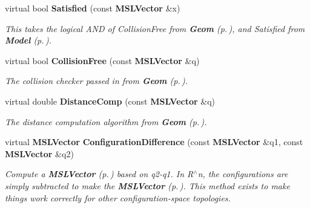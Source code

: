 \begin{CompactItemize}
virtual bool {\bf Satisfied} (const {\bf MSLVector} \&x)
\begin{CompactList}\small\item\em This takes the logical AND of Collision\-Free from {\bf Geom} {\rm (p.\,\pageref{class_Geom})}, and Satisfied from {\bf Model} {\rm (p.\,\pageref{class_Model})}.\item\end{CompactList}\item 
virtual bool {\bf Collision\-Free} (const {\bf MSLVector} \&q)
\begin{CompactList}\small\item\em The collision checker passed in from {\bf Geom} {\rm (p.\,\pageref{class_Geom})}.\item\end{CompactList}\item 
virtual double {\bf Distance\-Comp} (const {\bf MSLVector} \&q)
\begin{CompactList}\small\item\em The distance computation algorithm from {\bf Geom} {\rm (p.\,\pageref{class_Geom})}.\item\end{CompactList}\item 
virtual {\bf MSLVector} {\bf Configuration\-Difference} (const {\bf MSLVector} \&q1, const {\bf MSLVector} \&q2)
\begin{CompactList}\small\item\em Compute a {\bf MSLVector} {\rm (p.\,\pageref{class_MSLVector})} based on q2-q1. In R$^\wedge$n, the configurations are simply subtracted to make the {\bf MSLVector} {\rm (p.\,\pageref{class_MSLVector})}. This method exists to make things work correctly for other configuration-space topologies.\item\end{CompactList}\end{CompactItemize}
